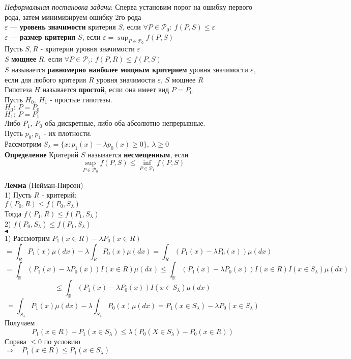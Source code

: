 \documentclass{article}
\begin{document}
\textit{Неформальная постановка задачи}: Сперва установим порог на ошибку первого рода, затем минимизируем ошибку 2го рода\\

$\varepsilon$ --- \textbf{уровень значимости} критерия $S$, если $\forall P \in\mathcal{P}_0:\ f(P,S)\leq\varepsilon$\\

$\varepsilon$ --- \textbf{размер критерия} $S$, если $\varepsilon = \sup_{P\in\mathcal{P}_0}{f(P,S)}$\\

Пусть $S, R$ - критерии уровня значимости $\varepsilon$\\
$S$ \textbf{мощнее} $R$, если $\forall P\in\mathcal{P}_):\ f(P,R)\leq f(P,S)$\\

$S$ называется \textbf{равномерно наиболее мощным критерием} уровня значимости $\varepsilon$, если для любого критерия $R$ уровня значимости $\varepsilon$, $S$ мощнее $R$\\

Гипотеза $H$ называется \textbf{простой}, если она имеет вид $P=P_0$\\

Пусть $H_0,\ H_1$ - простые гипотезы.\\
$H_0:\ P=P_0$\\$H_1:\ P=P_1$\\

Либо $P_1,\ P_0$ оба дискретные, либо оба абсолютно непрерывные.\\

Пусть $p_0, p_1$ - их плотности.\\

Рассмотрим $S_\lambda = \{x: p_1(x) - \lambda p_0(x) \geq 0 \},\ \lambda\geq 0$\\

\textbf{Определение} Критерий $S$ называется \textbf{несмещенным}, если
$$\sup_{P\in\mathcal{P}_0}{f(P,S)}\leq\inf_{P\in\mathcal{P}_1}{f(P,S)}$$

\textbf{Лемма} (Нейман-Пирсон)\\
1) Пусть $R$ - критерий:\\
$f(P_0, R) \leq f(P_0,S_\lambda)$\\
Тогда $f(P_1,R)\leq f(P_1,S_\lambda)$\\
2) $f(P_0,S_\lambda)\leq f(P_1,S_\lambda)$\\
$\blacktriangleleft$\\
1) Рассмотрим $P_1(x\in R) - \lambda P_0(x\in R)$
$$ = \int_R{P_1(x)\mu(dx)} - \lambda\int_R{P_0(x)\mu(dx)} = \int_R{(P_1(x) - \lambda P_0(x))\mu(dx)}$$
$$ = \int_\mathbb{R}{(P_1(x) - \lambda P_0(x))I(x\in R)\mu(dx)} \leq \int_\mathbb{R}{(P_1(x) - \lambda P_0(x))I(x\in R)I(x\in S_\lambda)\mu(dx)}$$
$$\leq \int_\mathbb{R}{(P_1(x) - \lambda P_0(x))I(x\in S_\lambda)\mu(dx)}$$
$$ = \int_{S_\lambda}{P_1(x)\mu(dx)} - \lambda\int_{S_\lambda}{P_0(x)\mu(dx)} = P_1(x\in S_\lambda) - \lambda P_0(x\in S_\lambda)$$
Получаем
$$ P_1(x\in R) - P_1(x\in S_\lambda) \leq \lambda(P_0(X\in S_\lambda) - P_0(x\in R)) $$
Справа $\leq 0$ по условию\\
$\Rightarrow\ \ \ \ P_1(x\in R)\leq P_1(x\in S_\lambda)$\\
\end{document}
